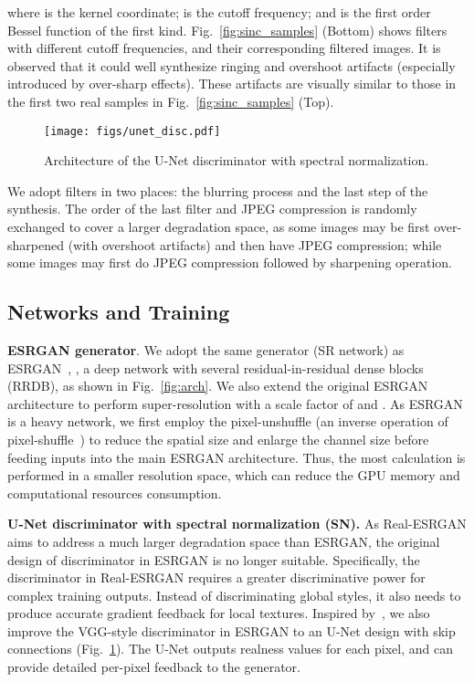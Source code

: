 \documentclass[10pt,twocolumn,letterpaper]{article}
\begin{document}
where  is the kernel coordinate;  is the cutoff frequency; and  is
the first order Bessel function of the first kind.
Fig.~\ref{fig:sinc_samples} (Bottom) shows  filters with different cutoff frequencies, and their corresponding filtered images. It is observed that it could well synthesize ringing and overshoot artifacts (especially introduced by over-sharp effects). These artifacts are visually similar to those in the first two real samples in Fig.~\ref{fig:sinc_samples} (Top).

\begin{figure}[t]
\begin{center}
\texttt{[image: figs/unet\_disc.pdf]}
	\end{center}
	\vspace{-0.5cm}
	\caption{Architecture of the U-Net discriminator with spectral normalization.}
	\label{fig:unet_disc}
	\vspace{-0.5cm}
\end{figure}

We adopt  filters in two places: the blurring process and the last step of the synthesis.
The order of the last  filter and JPEG compression is randomly exchanged to cover a larger degradation space, as some images may be first over-sharpened (with overshoot artifacts) and then have JPEG compression; while some images may first do JPEG compression followed by sharpening operation.

\subsection{Networks and Training}
\noindent\textbf{ESRGAN generator}. We adopt the same generator (SR network) as ESRGAN~\cite{wang2018esrgan}, \ie, a deep network with several residual-in-residual dense blocks (RRDB), as shown in Fig.~\ref{fig:arch}.
We also extend the original  ESRGAN architecture to perform super-resolution with a scale factor of  and . As ESRGAN is a heavy network, we first employ the pixel-unshuffle (an inverse operation of pixel-shuffle~\cite{shi2016real}) to reduce the spatial size and enlarge the channel size before feeding inputs into the main ESRGAN architecture. Thus, the most calculation is performed in a smaller resolution space, which can reduce the GPU memory and computational resources consumption.

\noindent\textbf{U-Net discriminator with spectral normalization (SN).}
As Real-ESRGAN aims to address a much larger degradation space than ESRGAN, the original design of discriminator in ESRGAN is no longer suitable.
Specifically, the discriminator in Real-ESRGAN requires a greater discriminative power for complex training outputs.
Instead of discriminating global styles, it also needs to produce accurate gradient feedback for local textures.
Inspired by~\cite{schonfeld2020u,yan2021fine}, we also improve the VGG-style discriminator in ESRGAN to an U-Net design with skip connections (Fig.~\ref{fig:unet_disc}). The U-Net outputs realness values for each pixel, and can provide detailed per-pixel feedback to the generator.
\end{document}
